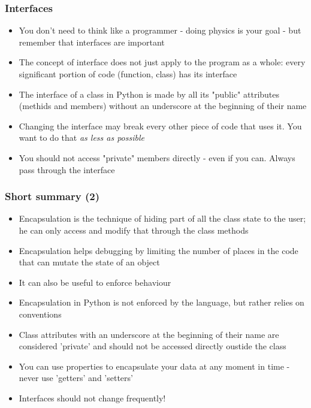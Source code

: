 \documentclass[9pt]{beamer}
\begin{document}
 
\begin{frame}
  \frametitle{Interfaces}
    
  \begin{itemize}
    \item You don't need to think like a programmer - doing physics is your goal - but
          remember that \alert{interfaces are important}
    \medskip
    \item The concept of interface does not just apply to the program as a whole:
          every significant portion of code (function, class) has its interface
    \medskip
    \item The interface of a class in Python is made by all its "public" attributes (methids and members)
          without an underscore at the beginning of their name
    \medskip
    \item Changing the interface may break every other piece of code that uses it.
          You want to do that \emph{as less as possible}
    \medskip
    \item You should not access "private" members directly - even if you can. Always
          pass through the interface
    
  \end{itemize}

\end{frame}


\begin{frame}
  \frametitle{Short summary (2)}
    
  \begin{itemize}
    \small
    \item Encapsulation is the technique of hiding part of all the class state to the user; 
          he can only access and modify that through the class methods
    \medskip
    \item Encapsulation helps debugging by limiting the number of places in the code
          that can mutate the state of an object
    \medskip
    \item It can also be useful to enforce behaviour  
    \medskip
    \item Encapsulation in Python is not enforced by the language, but rather relies on conventions
    \medskip
    \item Class attributes with an underscore at the beginning of their name are
          considered 'private' and should not be accessed directly oustide the class
    \smallskip
    \item You can use properties to encapsulate your data at any moment in time - never use 'getters' and 'setters'
    \medskip
    \item Interfaces should not change frequently!
  \end{itemize}
  
\end{frame}
\end{document}
